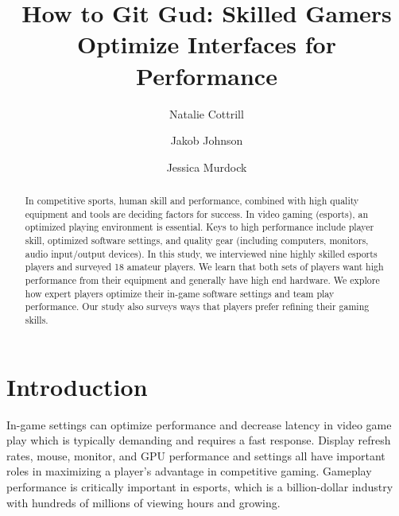 \documentclass[11pt,manuscript,screen,review]{acmart} %
\begin{document}
\title{How to Git Gud: Skilled Gamers Optimize Interfaces for Performance}

\author{Natalie Cottrill}

\author{Jakob Johnson}

\author{Jessica Murdock}

\begin{abstract}
In competitive sports, human skill and performance, combined with high quality equipment and tools are deciding factors for success. In video gaming (esports), an optimized playing environment is essential. Keys to high performance include player skill, optimized software settings, and quality gear (including computers, monitors, audio input/output devices). In this study, we interviewed nine highly skilled esports players and surveyed 18 amateur players. We learn that both sets of players want high performance from their equipment and generally have high end hardware. We explore how expert players optimize their in-game software settings and team play performance. Our study also surveys ways that players prefer refining their gaming skills.
\end{abstract}


\maketitle

\section{Introduction}
In-game settings can optimize performance and decrease latency in video game play \cite{Liu2021} which is typically demanding and requires a fast response. Display refresh rates, mouse, monitor, and GPU performance and settings all have important roles in maximizing a player's advantage in competitive gaming. Gameplay performance is critically important in esports, which is a billion-dollar industry \cite{ayles2019} with hundreds of millions of viewing hours and growing. 
\end{document}
